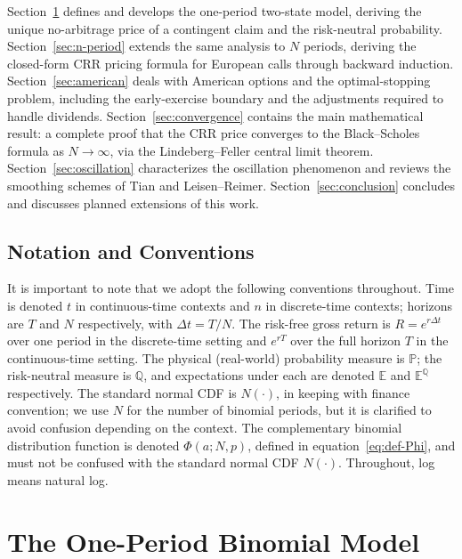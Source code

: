 \documentclass[11pt,a4paper]{article}
\newif\ifincludenumerics
\newif\ifincludeempirical
\theoremstyle{plain}
\theoremstyle{definition}
\newcommand{\E}{\mathbb{E}}
\newcommand{\Prob}{\mathbb{P}}
\newcommand{\Q}{\mathbb{Q}}
\begin{document}
Section~\ref{sec:one-period} defines and develops the one-period two-state model,
deriving the unique no-arbitrage price of a contingent claim and the
risk-neutral probability. Section~\ref{sec:n-period} extends the same 
analysis to $N$ periods, deriving the closed-form CRR pricing formula
for European calls through backward induction.
Section~\ref{sec:american} deals with American options and the
optimal-stopping problem, including the early-exercise boundary and
the adjustments required to handle dividends.
Section~\ref{sec:convergence} contains the main
mathematical result: a complete proof that the CRR price converges to
the Black--Scholes formula as $N \to \infty$, via the
Lindeberg--Feller central limit theorem.
Section~\ref{sec:oscillation} characterizes the oscillation
phenomenon and reviews the smoothing schemes of Tian and
Leisen--Reimer. \ifincludenumerics
Section~\ref{sec:numerics} presents algorithmic
details and convergence experiments.
\fi
\ifincludeempirical
Section~\ref{sec:empirical} reports the empirical calibration study
on SPX index options, using WRDS data.
\fi Section~\ref{sec:conclusion} concludes and
discusses planned extensions of this work.

\subsection{Notation and Conventions}

It is important to note that we adopt the following conventions throughout. Time is denoted $t$ in continuous-time contexts and $n$ in discrete-time contexts; horizons
are $T$ and $N$ respectively, with $\Delta t = T/N$. The risk-free
gross return is $R = e^{r \Delta t}$ over one period in the
discrete-time setting and $e^{rT}$ over the full horizon $T$ in the
continuous-time setting. The physical (real-world) probability measure
is $\Prob$; the risk-neutral measure is $\Q$, and expectations under
each are denoted $\E$ and $\E^{\Q}$ respectively. The standard normal
CDF is $N(\cdot)$, in keeping with finance convention; we use $N$ for
the number of binomial periods, but it is clarified to avoid confusion depending on the context.
The complementary binomial distribution function is denoted
$\Phi(a; N, p)$, defined in equation~\eqref{eq:def-Phi}, and must not
be confused with the standard normal CDF $N(\cdot)$. Throughout, log
means natural log.

\section{The One-Period Binomial Model}
\label{sec:one-period}
\end{document}
